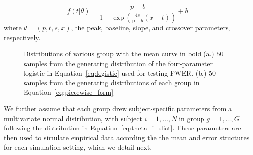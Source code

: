 \documentclass{article}
\begin{document}
\begin{equation}\label{eq:logistic}
f(t | \theta) = \frac{p-b}{1 + \exp \left(\frac{4s}{\text{p}-b} (x - t) \right)} + b
\end{equation}
where $\theta = (p, b, s, x)$, the peak, baseline, slope, and crossover parameters, respectively.


\begin{figure}
    \centering
    \caption{Distributions of various group with the mean curve in bold (a.) 50 samples from the generating distribution of the four-parameter logistic in Equation~\ref{eq:logistic} used for testing FWER. (b.) 50 samples from the generating distributions of each group in Equation~\ref{eq:piecewise_form}}
\label{fig:distribution}
\end{figure}



We further assume that each group drew subject-specific parameters from a multivariate normal distribution, with subject $i = 1, \dots, N$ in group $g = 1, \dots, G$ following the distribution in Equation~\ref{eq:theta_i_dist}. These parameters are then used to simulate empirical data according the the mean and error structures for each simulation setting, which we detail next. 
\end{document}
